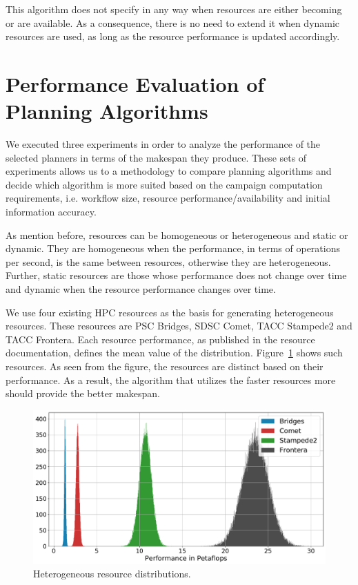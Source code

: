 This algorithm does not specify in any way when resources are either becoming or are available.
As a consequence, there is no need to extend it when dynamic resources are used, as long as the resource performance is updated accordingly.

\section{Performance Evaluation of Planning Algorithms}
\label{sec:algo_perf_comp}

We executed three experiments in order to analyze the performance of the selected planners in terms of the makespan they produce.
These sets of experiments allows us to a methodology to compare planning algorithms and decide which algorithm is more suited based on the campaign computation requirements, i.e. workflow size, resource performance/availability and initial information accuracy.

As mention before, resources can be homogeneous or heterogeneous and static or dynamic.
They are homogeneous when the performance, in terms of operations per second, is the same between resources, otherwise they are heterogeneous.
Further, static resources are those whose performance does not change over time and dynamic when the resource performance changes over time.

We use four existing HPC resources as the basis for generating heterogeneous resources.
These resources are PSC Bridges, SDSC Comet, TACC Stampede2 and TACC Frontera.
Each resource performance, as published in the resource documentation, defines the mean value of the distribution.
Figure~\ref{fig:heter_res} shows such resources.
As seen from the figure, the resources are distinct  based on their performance.
As a result, the algorithm that utilizes the faster resources more should provide the better makespan.

\begin{figure}[ht!]
    \centering
    \includegraphics[width=.95\textwidth]{figures/campaign/hetero_res.pdf}
    \caption{Heterogeneous resource distributions.}
    \label{fig:heter_res}
\end{figure}


